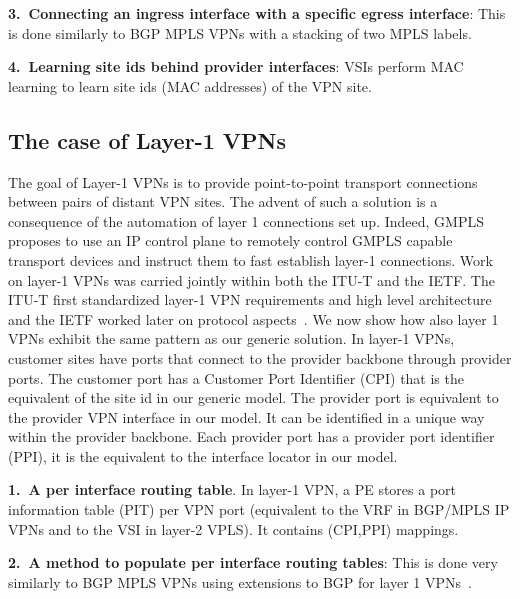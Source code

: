	\vspace{1mm}\noindent \textbf{3.~Connecting an ingress interface with a specific egress interface}: This is done similarly to BGP MPLS VPNs with a stacking of two MPLS labels.
	


	\vspace{1mm}\noindent \textbf{4.~Learning site ids behind provider interfaces}: VSIs perform MAC learning to learn site ids (MAC addresses) of the VPN site.




\subsection{The case of Layer-1 VPNs}
The goal of Layer-1 VPNs is to provide point-to-point transport connections between pairs of distant VPN sites. 
The advent of such a solution is a consequence of the automation of layer 1 connections set up. Indeed, GMPLS~\cite{gmpls} proposes to use an IP control plane to remotely control GMPLS capable transport devices and instruct them to fast establish layer-1 connections.   
Work on layer-1 VPNs was carried jointly within both the ITU-T and the IETF. The ITU-T first standardized layer-1 VPN requirements and high level architecture~\cite{l1vpn:itu2,l1vpn:itu} and the IETF worked later on protocol aspects~\cite{rfc5251,bgp:l1}. We now show how also layer 1 VPNs exhibit the same pattern as our generic solution. In layer-1 VPNs, customer sites have ports that connect to the provider backbone through provider ports. The customer port has a Customer Port Identifier (CPI) that is the equivalent of the site id in our generic model. The provider port is equivalent to the provider VPN interface in our model. It can be identified in a unique way within the provider backbone. Each provider port has a provider port identifier (PPI), it is the equivalent to the interface locator in our model.


\vspace{1mm}\noindent \textbf{1.~A per interface routing table}. In layer-1 VPN, a PE stores a port information table (PIT) per VPN port (equivalent to the VRF in BGP/MPLS IP VPNs and to the VSI in layer-2 VPLS). It contains (CPI,PPI) mappings.
	
	\vspace{1mm}\noindent \textbf{2.~A method to populate per interface routing tables}: This is done very similarly to BGP MPLS VPNs using extensions to BGP for layer 1 VPNs~\cite{bgp:l1}.

